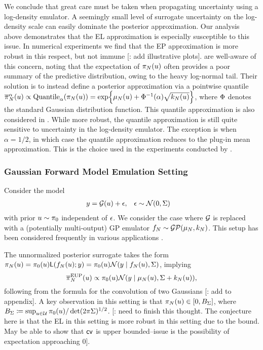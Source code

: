 \documentclass[12pt]{article}
\begin{document}
We conclude that great care must be taken when propagating uncertainty using a log-density emulator. 
A seemingly small level of surrogate uncertainty on the log-density scale can easily dominate the posterior
approximation. Our analysis above demonstrates that the EL approximation is especially susceptible to 
this issue. In numerical experiments we find that the EP approximation is more robust in this respect, 
but not immune [\todo: add illustrative plots]. \citet{VehtariParallelGP} are well-aware of this concern, 
noting that the expectation of $\pi_{N}(u)$ often provides a poor summary of the predictive distribution, 
owing to the heavy log-normal tail. Their solution is to instead define a posterior approximation via a pointwise 
quantile 
$\overline{\pi}_{N}^{\alpha}(u) \propto \mathrm{Quantile}_{\alpha}(\pi_{N}(u)) = \exp\mathopen{}\left\{\mu_{N}(u) + \Phi^{-1}(\alpha) \sqrt{k_{N}(u)}\right\}\mathclose{}$, where $\Phi$ denotes the standard Gaussian distribution function.
This quantile approximation is also considered in \citet{quantileApprox,FATES_CES}. While more robust, the quantile 
approximation is still quite sensitive to uncertainty in the log-density emulator. The exception is when $\alpha = 1/2$, in which 
case the quantile approximation reduces to the plug-in mean approximation. This is the choice used in the experiments
conducted by \citet{VehtariParallelGP}. 

\subsubsection{Gaussian Forward Model Emulation Setting} \label{sec:fwd-Gaussian} 
Consider the model
\begin{align}
&y = \mathcal{G}(u) + \epsilon, &&\epsilon \sim \mathcal{N}(0, \Sigma)
\end{align}
with prior $u \sim \pi_0$ independent of $\epsilon$. We consider the case 
where $\mathcal{G}$ is replaced with a (potentially multi-output) GP emulator 
$f_{N} \sim \mathcal{GP}(\mu_{N}, k_{N})$. This setup has been considered frequently in various 
applications \citep{Surer2023sequential,weightedIVAR,StuartTeck2,GP_PDE_priors,CES,
idealizedGCM,villani2024posteriorsamplingadaptivegaussian,hydrologicalModel,hydrologicalModel2}.

The unnormalized posterior surrogate takes the form 
$\pi_{N}(u) = \pi_0(u)\mathsf{L}(f_{N}(u); y) =  \pi_0(u)\mathcal{N}(y \mid f_{N}(u), \Sigma)$, implying
\begin{equation}
\overline{\pi}_{N}^{\mathrm{EUP}}(u) \propto \pi_0(u) \mathcal{N}(y \mid \mu_{N}(u), \Sigma + k_{N}(u)),
\label{eq:EL-Gaussian-fwd}
\end{equation}
following from the formula for the convolution of two Gaussians [\todo: add to appendix].
A key observation in this setting is that $\pi_{N}(u) \in [0, B_{\Sigma}]$, where 
$B_{\Sigma} \coloneqq \sup_{u \in \mathcal{U}} \pi_0(u) / \det(2\pi\Sigma)^{1/2}$.
[\todo: need to finish this thought. The conjecture here is that the EL in this setting is 
more robust in this setting due to the bound. May be able to show that $\mathsf{cv}$ is upper
bounded--issue is the possibility of expectation approaching 0].
\end{document}
